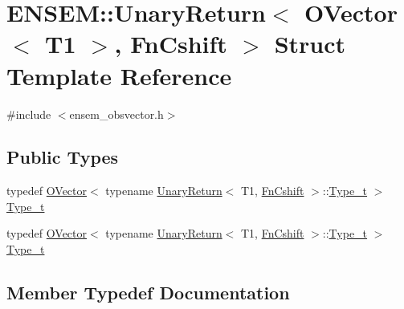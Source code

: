 \hypertarget{structENSEM_1_1UnaryReturn_3_01OVector_3_01T1_01_4_00_01FnCshift_01_4}{}\section{E\+N\+S\+EM\+:\+:Unary\+Return$<$ O\+Vector$<$ T1 $>$, Fn\+Cshift $>$ Struct Template Reference}
\label{structENSEM_1_1UnaryReturn_3_01OVector_3_01T1_01_4_00_01FnCshift_01_4}


{\ttfamily \#include $<$ensem\+\_\+obsvector.\+h$>$}

\subsection*{Public Types}
\begin{DoxyCompactItemize}
\item 
typedef \mbox{\hyperlink{classENSEM_1_1OVector}{O\+Vector}}$<$ typename \mbox{\hyperlink{structENSEM_1_1UnaryReturn}{Unary\+Return}}$<$ T1, \mbox{\hyperlink{structENSEM_1_1FnCshift}{Fn\+Cshift}} $>$\+::\mbox{\hyperlink{structENSEM_1_1UnaryReturn_3_01OVector_3_01T1_01_4_00_01FnCshift_01_4_a6a3a9c4bf8437765b92d9c0d26f56a19}{Type\+\_\+t}} $>$ \mbox{\hyperlink{structENSEM_1_1UnaryReturn_3_01OVector_3_01T1_01_4_00_01FnCshift_01_4_a6a3a9c4bf8437765b92d9c0d26f56a19}{Type\+\_\+t}}
\item 
typedef \mbox{\hyperlink{classENSEM_1_1OVector}{O\+Vector}}$<$ typename \mbox{\hyperlink{structENSEM_1_1UnaryReturn}{Unary\+Return}}$<$ T1, \mbox{\hyperlink{structENSEM_1_1FnCshift}{Fn\+Cshift}} $>$\+::\mbox{\hyperlink{structENSEM_1_1UnaryReturn_3_01OVector_3_01T1_01_4_00_01FnCshift_01_4_a6a3a9c4bf8437765b92d9c0d26f56a19}{Type\+\_\+t}} $>$ \mbox{\hyperlink{structENSEM_1_1UnaryReturn_3_01OVector_3_01T1_01_4_00_01FnCshift_01_4_a6a3a9c4bf8437765b92d9c0d26f56a19}{Type\+\_\+t}}
\end{DoxyCompactItemize}


\subsection{Member Typedef Documentation}
\mbox{\label{structENSEM_1_1UnaryReturn_3_01OVector_3_01T1_01_4_00_01FnCshift_01_4_a6a3a9c4bf8437765b92d9c0d26f56a19}} 
